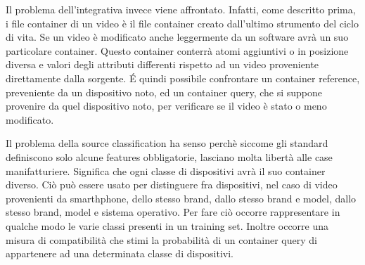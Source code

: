 Il problema dell'integrativa invece viene affrontato. Infatti, come descritto prima, i file container di un video è il file container creato dall'ultimo strumento del ciclo di vita. Se un video è modificato anche leggermente da un software avrà un suo particolare container. Questo container conterrà atomi aggiuntivi o in posizione diversa e valori degli attributi differenti rispetto ad un video proveniente direttamente dalla sorgente. É quindi possibile confrontare un container reference, preveniente da un dispositivo noto, ed un container query, che si suppone provenire da quel dispositivo noto, per verificare se il video è stato o meno modificato.

Il problema della source classification ha senso perchè siccome gli standard definiscono solo alcune features obbligatorie, lasciano molta libertà alle case manifatturiere. Significa che ogni classe di dispositivi avrà il suo container diverso. Ciò può essere usato per distinguere fra dispositivi, nel caso di video provenienti da smarthphone, dello stesso brand, dallo stesso brand e model, dallo stesso brand, model e sistema operativo.
Per fare ciò occorre rappresentare in qualche modo le varie classi presenti in un training set. Inoltre occorre una misura di compatibilità che stimi la probabilità di un container query di appartenere ad una determinata classe di dispositivi.